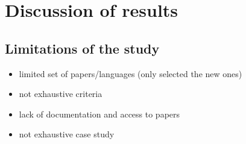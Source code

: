 \section{Discussion of results}\label{sec:evaluation-discussion-of-results}

\subsection{Limitations of the study}\label{subsec:limitations-of-the-study}
\begin{itemize}
    \item limited set of papers/languages (only selected the new ones)
    \item not exhaustive criteria
    \item lack of documentation and access to papers
    \item not exhaustive case study
\end{itemize}


